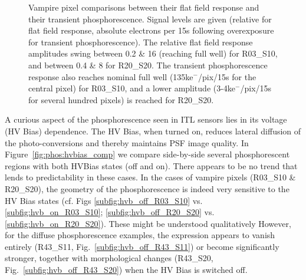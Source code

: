\begin{figure}[!htbp]
\newline
\caption{Vampire pixel comparisons between their flat field response and their transient phosphorescence. Signal levels are given (relative for flat field response, absolute electrons per 15s following overexposure for transient phosphorescence). The relative flat field response amplitudes swing between 0.2 \& 16 (reaching full well) for R03\_S10, and between 0.4 \& 8 for R20\_S20. The transient phosphorescence response also reaches nominal full well (135ke$^-$/pix/15s for the central pixel) for R03\_S10, and a lower amplitude (3-4ke$^-$/pix/15s for several hundred pixels) is reached for R20\_S20.}
\label{fig:vamp-phos:R03_S10-R20_S20}
\end{figure}

A curious aspect of the phosphorescence seen in ITL sensors lies in its voltage (HV Bias) dependence. The HV Bias, when turned on, reduces lateral diffusion of the photo-conversions and thereby maintains PSF image quality. In Figure~\ref{fig:phos:hvbias_comp} we compare side-by-side several phosphorescent regions with both HVBias states (off and on). There appears to be no trend that lends to predictability in these cases. In the cases of vampire pixels (R03\_S10 \& R20\_S20), the geometry of the phosphorescence is indeed very sensitive to the HV Bias states (cf. Figs \ref{subfig:hvb_off_R03_S10} vs. \ref{subfig:hvb_on_R03_S10}; \ref{subfig:hvb_off_R20_S20} vs. \ref{subfig:hvb_on_R20_S20}). These might be understood qualitatively However, for the diffuse phosphorescence examples, the expression appears to vanish entirely (R43\_S11, Fig.~\ref{subfig:hvb_off_R43_S11}) or become significantly stronger, together with morphological changes (R43\_S20, Fig.~\ref{subfig:hvb_off_R43_S20}) when the HV Bias is switched off.

